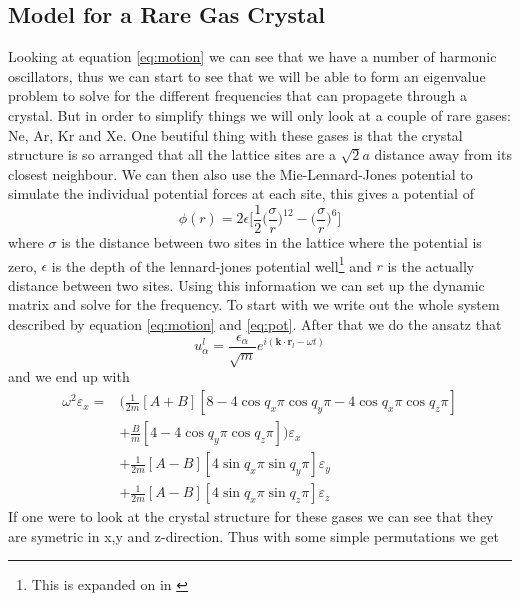 \documentclass[11pt]{article}
\begin{document}
\subsection{Model for a Rare Gas Crystal}
Looking at equation \ref{eq:motion} we can see that we have a number of harmonic oscillators, thus we can start to see that we will be able to form an eigenvalue problem to solve for the different frequencies that can propagete through a crystal. But in order to simplify things we will only look at a couple of rare gases: Ne, Ar, Kr and Xe. One beutiful thing with these gases is that the crystal structure is so arranged that all the lattice sites are a $\sqrt{2}a$ distance away from its closest neighbour. We can then also use the Mie-Lennard-Jones potential to simulate the individual potential forces at each site, this gives a potential of
\begin{equation}
	\phi(r) = 2 \epsilon \big[\frac{1}{2} \big(\frac{\sigma}{r}\big)^{12} - \big(\frac{\sigma}{r}\big)^6\big]
	\label{eq:pot}
\end{equation}
where $\sigma$ is the distance between two sites in the lattice where the potential is zero, $\epsilon$ is the depth of the lennard-jones potential well\footnote{This is expanded on in \cite{bib:wiki:mlj}} and $r$ is the actually distance between two sites. Using this information we can set up the dynamic matrix and solve for the frequency. To start with we write out the whole system described by equation \ref{eq:motion} and \ref{eq:pot}. After that we do the ansatz that 
\begin{equation}
	u^l_{\alpha} = \frac{\epsilon_{\alpha}}{\sqrt{m}}e^{i(\mathbf{k}\cdot\mathbf{r}_l-\omega t)}
\end{equation}
and we end up with 
\begin{align}
	\omega^2\varepsilon_x = &\big( \frac{1}{2m} [A+B][8-4\cos{q_x\pi}\cos{q_y\pi}-4\cos{q_x\pi}\cos{q_z\pi}] \\
	&+ \frac{B}{m}[4-4\cos{q_y\pi}\cos{q_z\pi}]\big)\varepsilon_x \\
	&+\frac{1}{2m}[A-B][4\sin{q_x\pi}\sin{q_y\pi}]\varepsilon_y \\
	&+\frac{1}{2m}[A-B][4\sin{q_x\pi}\sin{q_z\pi}]\varepsilon_z
	\label{eq:omega}
\end{align}
If one were to look at the crystal structure for these gases we can see that they are symetric in x,y and z-direction. Thus with some simple permutations we get
\end{document}
